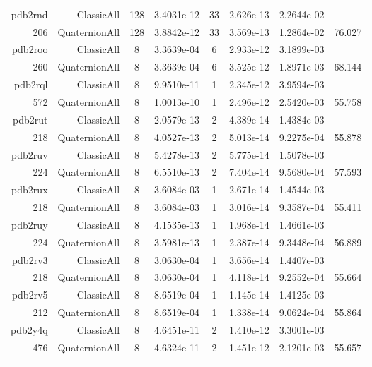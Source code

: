 \begin{xltabular}{\textwidth}{r|rcS[table-format=1.4e+2]cS[table-format=1.3e+2]S[table-format=1.4e+2]S[table-format=-1.3]}
pdb2rnd & ClassicAll & 128 & 3.4031e-12 & 33 & 2.626e-13 & 2.2644e-02 & \\
206 & QuaternionAll & 128 & 3.8842e-12 & 33 & 3.569e-13 & 1.2864e-02 & 76.027\\  \addlinespace
pdb2roo & ClassicAll & 8 & 3.3639e-04 & 6 & 2.933e-12 & 3.1899e-03 & \\
260 & QuaternionAll & 8 & 3.3639e-04 & 6 & 3.525e-12 & 1.8971e-03 & 68.144\\  \addlinespace
pdb2rql & ClassicAll & 8 & 9.9510e-11 & 1 & 2.345e-12 & 3.9594e-03 & \\
572 & QuaternionAll & 8 & 1.0013e-10 & 1 & 2.496e-12 & 2.5420e-03 & 55.758\\  \addlinespace
pdb2rut & ClassicAll & 8 & 2.0579e-13 & 2 & 4.389e-14 & 1.4384e-03 & \\
218 & QuaternionAll & 8 & 4.0527e-13 & 2 & 5.013e-14 & 9.2275e-04 & 55.878\\  \addlinespace
pdb2ruv & ClassicAll & 8 & 5.4278e-13 & 2 & 5.775e-14 & 1.5078e-03 & \\
224 & QuaternionAll & 8 & 6.5510e-13 & 2 & 7.404e-14 & 9.5680e-04 & 57.593\\  \addlinespace
pdb2rux & ClassicAll & 8 & 3.6084e-03 & 1 & 2.671e-14 & 1.4544e-03 & \\
218 & QuaternionAll & 8 & 3.6084e-03 & 1 & 3.016e-14 & 9.3587e-04 & 55.411\\  \addlinespace
pdb2ruy & ClassicAll & 8 & 4.1535e-13 & 1 & 1.968e-14 & 1.4661e-03 & \\
224 & QuaternionAll & 8 & 3.5981e-13 & 1 & 2.387e-14 & 9.3448e-04 & 56.889\\  \addlinespace
pdb2rv3 & ClassicAll & 8 & 3.0630e-04 & 1 & 3.656e-14 & 1.4407e-03 & \\
218 & QuaternionAll & 8 & 3.0630e-04 & 1 & 4.118e-14 & 9.2552e-04 & 55.664\\  \addlinespace
pdb2rv5 & ClassicAll & 8 & 8.6519e-04 & 1 & 1.145e-14 & 1.4125e-03 & \\
212 & QuaternionAll & 8 & 8.6519e-04 & 1 & 1.338e-14 & 9.0624e-04 & 55.864\\  \addlinespace
pdb2y4q & ClassicAll & 8 & 4.6451e-11 & 2 & 1.410e-12 & 3.3001e-03 & \\
476 & QuaternionAll & 8 & 4.6324e-11 & 2 & 1.451e-12 & 2.1201e-03 & 55.657\\  \addlinespace
\end{xltabular}
